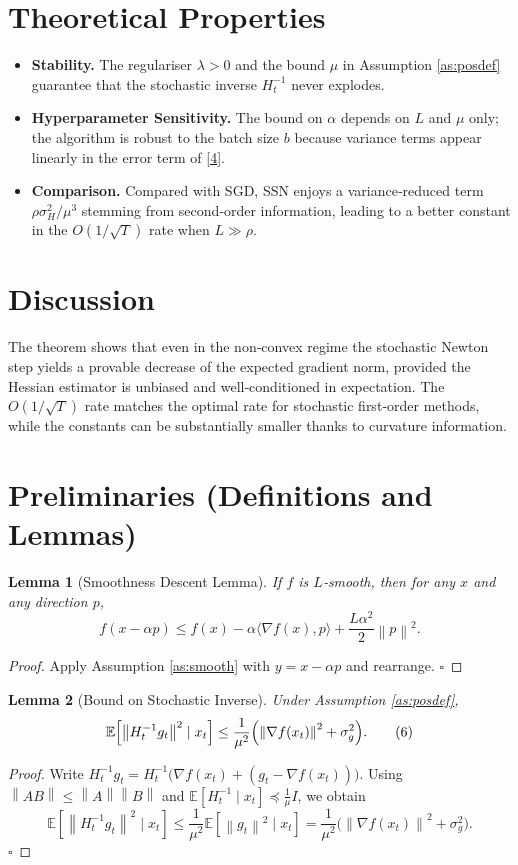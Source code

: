 \documentclass{article}
\newtheorem{lemma}{Lemma}
\newcommand{\E}{\mathbb{E}}
\newcommand{\norm}[1]{\left\|#1\right\|}
\newcommand{\iprod}[2]{\langle #1,#2\rangle}
\begin{document}
\section*{Theoretical Properties}
\begin{itemize}
\item \textbf{Stability.} The regulariser $\lambda>0$ and the bound $\mu$ in Assumption \ref{as:posdef} guarantee that the stochastic inverse $H_t^{-1}$ never explodes.
\item \textbf{Hyperparameter Sensitivity.} The bound on $\alpha$ depends on $L$ and $\mu$ only; the algorithm is robust to the batch size $b$ because variance terms appear linearly in the error term of \eqref{4}.
\item \textbf{Comparison.} Compared with SGD, SSN enjoys a variance‑reduced term $\rho\sigma_H^{2}/\mu^{3}$ stemming from second‑order information, leading to a better constant in the $O(1/\sqrt{T})$ rate when $L\gg\rho$.
\end{itemize}

\section*{Discussion}
The theorem shows that even in the non‑convex regime the stochastic Newton step yields a provable decrease of the expected gradient norm, provided the Hessian estimator is unbiased and well‑conditioned in expectation. The $O(1/\sqrt{T})$ rate matches the optimal rate for stochastic first‑order methods, while the constants can be substantially smaller thanks to curvature information.

\newpage
\section*{Preliminaries (Definitions and Lemmas)}
\begin{lemma}[Smoothness Descent Lemma]\label{lem:smooth}
If $f$ is $L$‑smooth, then for any $x$ and any direction $p$,
\[
f(x-\alpha p)\le f(x)-\alpha\iprod{\nabla f(x)}{p}
+\frac{L\alpha^{2}}{2}\norm{p}^{2}.
\tag{5}
\]
\end{lemma}
\begin{proof}
Apply Assumption \ref{as:smooth} with $y=x-\alpha p$ and rearrange. \hfill $\square$
\end{proof}

\begin{lemma}[Bound on Stochastic Inverse]\label{lem:inv}
Under Assumption \ref{as:posdef},
\[
\E\!\left[\norm{H_t^{-1}g_t}^{2}\mid x_t\right]
\le \frac{1}{\mu^{2}}\Bigl(\norm{\nabla f(x_t)}^{2}+\sigma_g^{2}\Bigr).
\tag{6}
\]
\end{lemma}
\begin{proof}
Write $H_t^{-1}g_t = H_t^{-1}\bigl(\nabla f(x_t)+(g_t-\nabla f(x_t))\bigr)$.  
Using $\norm{AB}\le\norm{A}\norm{B}$ and $\E[H_t^{-1}\mid x_t]\preceq\frac{1}{\mu}I$, we obtain
\[
\E\!\left[\norm{H_t^{-1}g_t}^{2}\mid x_t\right]
\le\frac{1}{\mu^{2}}\E\!\left[\norm{g_t}^{2}\mid x_t\right]
=\frac{1}{\mu^{2}}\bigl(\norm{\nabla f(x_t)}^{2}+\sigma_g^{2}\bigr).
\] \hfill $\square$
\end{proof}
\end{document}

